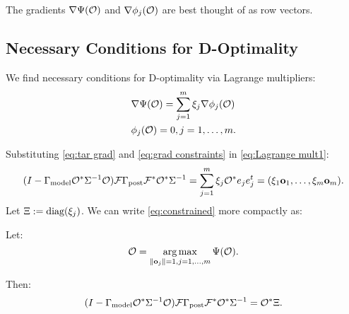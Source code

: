 The gradients $\nabla \Psi(\mathcal{O})$ and $\nabla \phi_j(\mathcal{O})$ are best
thought of as row vectors.


\subsection{Necessary Conditions for D-Optimality}\label{subsec:necessary}
We find necessary conditions for D-optimality via Lagrange
multipliers:
\begin{align}
  &\nabla \tar(\obs) = \sum_{j=1}^m \xi_j \nabla \phi_j (\obs)
  \label{eq:Lagrange mult1} \\
    &\phi_j(\obs) = 0, j = 1,\dots,m. \label{eq:Lagrange mult2}
\end{align}


Substituting \eqref{eq:tar grad} and \eqref{eq:grad constraints} in
\eqref{eq:Lagrange mult1}:
\begin{equation}\label{eq:constrained}
  (I - \modcov \obs^* \Sigma^{-1} \obs) \fwd \postcov \fwd^* \obs^*\Sigma^{-1}
  = \sum_{j=1}^m \xi_j \obs^* e_je_j^t = (\xi_1 \meas_1,\dots,\xi_m \meas_m).
\end{equation}
Let $\Xi := \textup{diag}(\xi_j)$. We can write \eqref{eq:constrained} more
compactly as:

\begin{theorem}\label{thm:constrained}
  Let:
  \begin{equation*}
    \obs = \argmax_{\|\meas_j\| = 1, j=1,\dots,m}\tar(\obs).
  \end{equation*}
  
  Then:
  \begin{equation*}
    ( I - \modcov \obs^* \Sigma^{-1} \obs) \fwd \postcov \fwd^* \obs^*  \Sigma^{-1}
    = \obs^* \Xi.
  \end{equation*}
\end{theorem}





